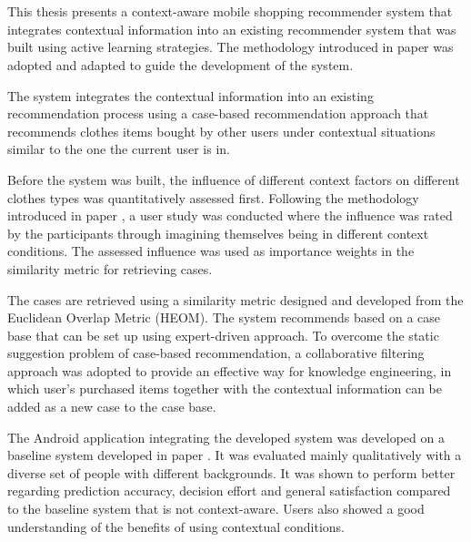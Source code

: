 \chapter{\abstractname}



This thesis presents a context-aware mobile shopping recommender system that integrates contextual information into an existing recommender system that was built using active learning strategies. The methodology introduced in paper \cite{ref:5} was adopted and adapted to guide the development of the system.

The system integrates the contextual information into an existing recommendation process using a case-based recommendation approach that recommends clothes items bought by other users under contextual situations similar to the one the current user is in. 

Before the system was built, the influence of different context factors on different clothes types was quantitatively assessed first. Following the methodology introduced in paper \cite{ref:18}, a user study was conducted where the influence was rated by the participants through imagining themselves being in different context conditions. The assessed influence was used as importance weights in the similarity metric for retrieving cases.

The cases are retrieved using a similarity metric designed and developed from the Euclidean Overlap Metric (HEOM). The system recommends based on a case base that can be set up using expert-driven approach. To overcome the static suggestion problem of case-based recommendation, a collaborative filtering approach was adopted to provide an effective way for knowledge engineering, in which user's purchased items together with the contextual information can be added as a new case to the case base. 

The Android application integrating the developed system was developed on a baseline system developed in paper \cite{ref:30}. It was evaluated mainly qualitatively with a diverse set of people with different backgrounds. It was shown to perform better regarding prediction accuracy, decision effort and general satisfaction compared to the baseline system that is not context-aware. Users also showed a good understanding of the benefits of using contextual conditions.



